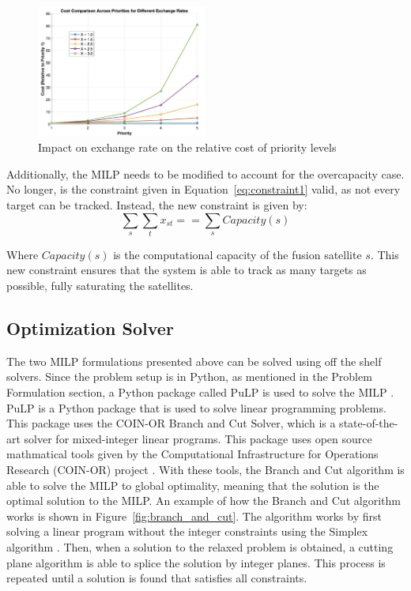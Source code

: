     \begin{figure}[h]
        \centering
        \includegraphics[width=0.5\textwidth]{figs/cost_vs_priority.png}
        \caption{Impact on exchange rate on the relative cost of priority levels}
        \label{fig:priority_cost}
    \end{figure}

    Additionally, the MILP needs to be modified to account for the overcapacity case.
    No longer, is the constraint given in Equation~\eqref{eq:constraint1} valid, as not every target can be tracked.
    Instead, the new constraint is given by:
    \begin{equation}
        \sum_{s} \sum_{t} x_{st} == \sum_{s} Capacity(s)
        \label{eq:constraint_overcapacity}
    \end{equation}

    Where $Capacity(s)$ is the computational capacity of the fusion satellite $s$. This new constraint ensures that the system is able to track as many targets as possible, fully saturating the satellites.

\subsection{Optimization Solver}


    The two MILP formulations presented above can be solved using off the shelf solvers. 
    Since the problem setup is in Python, as mentioned in the Problem Formulation section, a Python package called PuLP is used to solve the MILP \cite{b6}.
    PuLP is a Python package that is used to solve linear programming problems.
    This package uses the COIN-OR Branch and Cut Solver, which is a state-of-the-art solver for mixed-integer linear programs.
    This package uses open source mathmatical tools given by the Computational Infrastructure for Operations Research (COIN-OR) project \cite{b2}.  
    With these tools, the Branch and Cut algorithm is able to solve the MILP to global optimality, meaning that the solution is the optimal solution to the MILP.
    An example of how the Branch and Cut algorithm works is shown in Figure~\ref{fig:branch_and_cut}. 
    The algorithm works by first solving a linear program without the integer constraints using the Simplex algorithm \cite{b7}.
    Then, when a solution to the relaxed problem is obtained, a cutting plane algorithm is able to splice the solution by integer planes.
    This process is repeated until a solution is found that satisfies all constraints.

